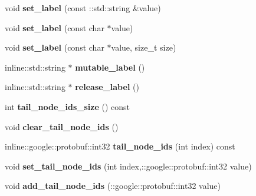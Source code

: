 \begin{DoxyCompactItemize}
\item 
\hypertarget{classHypergraph__Edge_aa2bf7284766e49962c3a6cba6d8495cc}{
void {\bfseries set\_\-label} (const ::std::string \&value)}
\label{classHypergraph__Edge_aa2bf7284766e49962c3a6cba6d8495cc}

\item 
\hypertarget{classHypergraph__Edge_abd03f3020632e7d2fedae16116853e55}{
void {\bfseries set\_\-label} (const char $\ast$value)}
\label{classHypergraph__Edge_abd03f3020632e7d2fedae16116853e55}

\item 
\hypertarget{classHypergraph__Edge_adb4ad80e1805c7355ad9aad07bdddff7}{
void {\bfseries set\_\-label} (const char $\ast$value, size\_\-t size)}
\label{classHypergraph__Edge_adb4ad80e1805c7355ad9aad07bdddff7}

\item 
\hypertarget{classHypergraph__Edge_a12f6b0a4404d8e64abc0ae29f0145db3}{
inline::std::string $\ast$ {\bfseries mutable\_\-label} ()}
\label{classHypergraph__Edge_a12f6b0a4404d8e64abc0ae29f0145db3}

\item 
\hypertarget{classHypergraph__Edge_a3a32715f4a9f4eaf3f15b7fabe45df69}{
inline::std::string $\ast$ {\bfseries release\_\-label} ()}
\label{classHypergraph__Edge_a3a32715f4a9f4eaf3f15b7fabe45df69}

\item 
\hypertarget{classHypergraph__Edge_ab4a326ca4b060c3a3b96356875615274}{
int {\bfseries tail\_\-node\_\-ids\_\-size} () const }
\label{classHypergraph__Edge_ab4a326ca4b060c3a3b96356875615274}

\item 
\hypertarget{classHypergraph__Edge_a7bca4b7aa0ddb3c3db383cf4f9ae4010}{
void {\bfseries clear\_\-tail\_\-node\_\-ids} ()}
\label{classHypergraph__Edge_a7bca4b7aa0ddb3c3db383cf4f9ae4010}

\item 
\hypertarget{classHypergraph__Edge_aa6efe64d446630db07b2536a0366c92f}{
inline::google::protobuf::int32 {\bfseries tail\_\-node\_\-ids} (int index) const }
\label{classHypergraph__Edge_aa6efe64d446630db07b2536a0366c92f}

\item 
\hypertarget{classHypergraph__Edge_aff9ace3fb27f13d171ae18139cd01784}{
void {\bfseries set\_\-tail\_\-node\_\-ids} (int index,::google::protobuf::int32 value)}
\label{classHypergraph__Edge_aff9ace3fb27f13d171ae18139cd01784}

\item 
\hypertarget{classHypergraph__Edge_ad94f1a04bf6815d17ca4121ff6770bee}{
void {\bfseries add\_\-tail\_\-node\_\-ids} (::google::protobuf::int32 value)}
\label{classHypergraph__Edge_ad94f1a04bf6815d17ca4121ff6770bee}


\end{DoxyCompactItemize}
